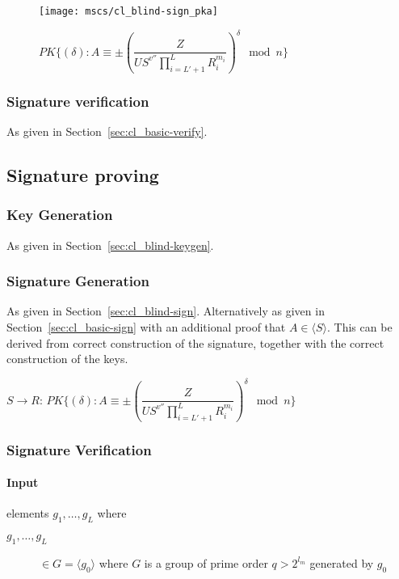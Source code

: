 \begin{figure}[ht]
  \centering
  \texttt{[image: mscs/cl\_blind-sign\_pka]}
  \caption{$PK\{(\delta) :
  A \equiv \pm \left(\dfrac{Z}{U S^{v''} \prod_{i=L'+1}^{L} R_i^{m_i}} \right)^{\delta} \mod n \}$}
  \label{msc:cl_blind-sign_pka}
\end{figure}

\subsubsection{Signature verification}\label{sec:cl_blind-verify}

As given in Section~\ref{sec:cl_basic-verify}.

\subsection{Signature proving}\label{sec:cl_proof}

\subsubsection{Key Generation}\label{sec:cl_proof-keygen}

As given in Section~\ref{sec:cl_blind-keygen}.

\subsubsection{Signature Generation}\label{sec:cl_proof-sign}

As given in Section~\ref{sec:cl_blind-sign}. Alternatively as given in Section~\ref{sec:cl_basic-sign} with an additional proof that $A \in \langle S \rangle$. This can be derived from correct construction of the signature, together with the correct construction of the keys.

$S \longrightarrow R$: $PK\{(\delta) : A \equiv \pm \left(\dfrac{Z}{U S^{v''} \prod_{i=L'+1}^{L} R_i^{m_i}} \right)^{\delta} \mod n \}$

\subsubsection{Signature Verification}\label{sec:cl_proof-verify}

\paragraph{Input} elements $g_1, \dots, g_L$ where
\begin{description}
  \item[$g_1, \dots, g_L$] $\in G = \langle g_0 \rangle$ where $G$ is a group of prime order $q > 2^{l_m}$ generated by $g_0$
\end{description}

